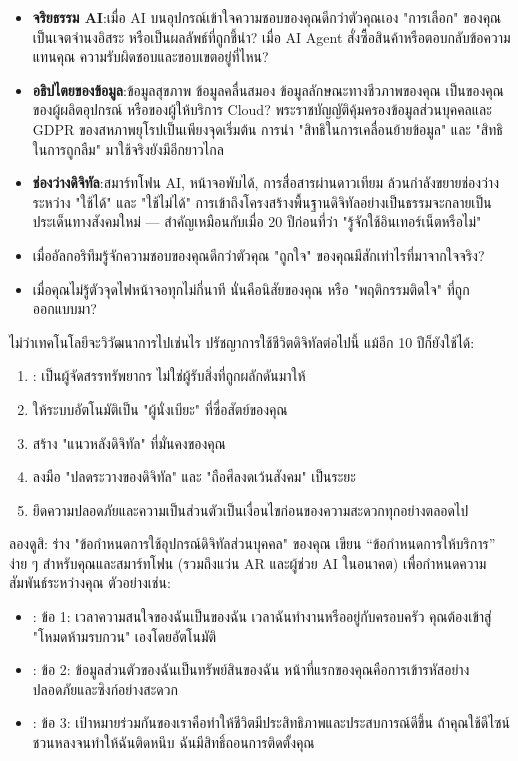 \begin{itemize}
  \item \textbf{จริยธรรม AI}:เมื่อ AI บนอุปกรณ์เข้าใจความชอบของคุณดีกว่าตัวคุณเอง "การเลือก" ของคุณเป็นเจตจำนงอิสระ หรือเป็นผลลัพธ์ที่ถูกชี้นำ? เมื่อ AI Agent สั่งซื้อสินค้าหรือตอบกลับข้อความแทนคุณ ความรับผิดชอบและขอบเขตอยู่ที่ไหน?
  \item \textbf{อธิปไตยของข้อมูล}:ข้อมูลสุขภาพ ข้อมูลคลื่นสมอง ข้อมูลลักษณะทางชีวภาพของคุณ เป็นของคุณ ของผู้ผลิตอุปกรณ์ หรือของผู้ให้บริการ Cloud? พระราชบัญญัติคุ้มครองข้อมูลส่วนบุคคลและ GDPR ของสหภาพยุโรปเป็นเพียงจุดเริ่มต้น การนำ "สิทธิในการเคลื่อนย้ายข้อมูล" และ "สิทธิในการถูกลืม" มาใช้จริงยังมีอีกยาวไกล
  \item \textbf{ช่องว่างดิจิทัล}:สมาร์ทโฟน AI, หน้าจอพับได้, การสื่อสารผ่านดาวเทียม ล้วนกำลังขยายช่องว่างระหว่าง "ใช้ได้" และ "ใช้ไม่ได้" การเข้าถึงโครงสร้างพื้นฐานดิจิทัลอย่างเป็นธรรมจะกลายเป็นประเด็นทางสังคมใหม่ — สำคัญเหมือนกับเมื่อ 20 ปีก่อนที่ว่า "รู้จักใช้อินเทอร์เน็ตหรือไม่"
  \item เมื่ออัลกอริทึมรู้จักความชอบของคุณดีกว่าตัวคุณ "ถูกใจ" ของคุณมีสักเท่าไรที่มาจากใจจริง?
  \item เมื่อคุณไม่รู้ตัวจุดไฟหน้าจอทุกไม่กี่นาที นั่นคือนิสัยของคุณ หรือ "พฤติกรรมติดใจ" ที่ถูกออกแบบมา?
\end{itemize}


ไม่ว่าเทคโนโลยีจะวิวัฒนาการไปเช่นไร ปรัชญาการใช้ชีวิตดิจิทัลต่อไปนี้ แม้อีก 10 ปีก็ยังใช้ได้:

\begin{enumerate}
  \item : เป็นผู้จัดสรรทรัพยากร ไม่ใช่ผู้รับสิ่งที่ถูกผลักดันมาให้
  \item ให้ระบบอัตโนมัติเป็น "ผู้นั่งเบียะ" ที่ซื่อสัตย์ของคุณ
  \item สร้าง "แนวหลังดิจิทัล" ที่มั่นคงของคุณ
  \item ลงมือ "ปลดระวางของดิจิทัล" และ "ถือศีลงดเว้นสังคม" เป็นระยะ
  \item ยึดความปลอดภัยและความเป็นส่วนตัวเป็นเงื่อนไขก่อนของความสะดวกทุกอย่างตลอดไป
\end{enumerate}

\begin{tcbpractice}{ลองดูสิ: ร่าง "ข้อกำหนดการใช้อุปกรณ์ดิจิทัลส่วนบุคคล" ของคุณ}
เขียน “ข้อกำหนดการให้บริการ” ง่าย ๆ สำหรับคุณและสมาร์ทโฟน (รวมถึงแว่น AR และผู้ช่วย AI ในอนาคต) เพื่อกำหนดความสัมพันธ์ระหว่างคุณ ตัวอย่างเช่น:

\begin{itemize}
  \item : ข้อ 1: เวลาความสนใจของฉันเป็นของฉัน เวลาฉันทำงานหรืออยู่กับครอบครัว คุณต้องเข้าสู่ "โหมดห้ามรบกวน" เองโดยอัตโนมัติ
  \item : ข้อ 2: ข้อมูลส่วนตัวของฉันเป็นทรัพย์สินของฉัน หน้าที่แรกของคุณคือการเข้ารหัสอย่างปลอดภัยและซิงก์อย่างสะดวก
  \item : ข้อ 3: เป้าหมายร่วมกันของเราคือทำให้ชีวิตมีประสิทธิภาพและประสบการณ์ดีขึ้น ถ้าคุณใช้ดีไซน์ชวนหลงจนทำให้ฉันติดหนึบ ฉันมีสิทธิ์ถอนการติดตั้งคุณ
\end{itemize}

\end{tcbpractice}

